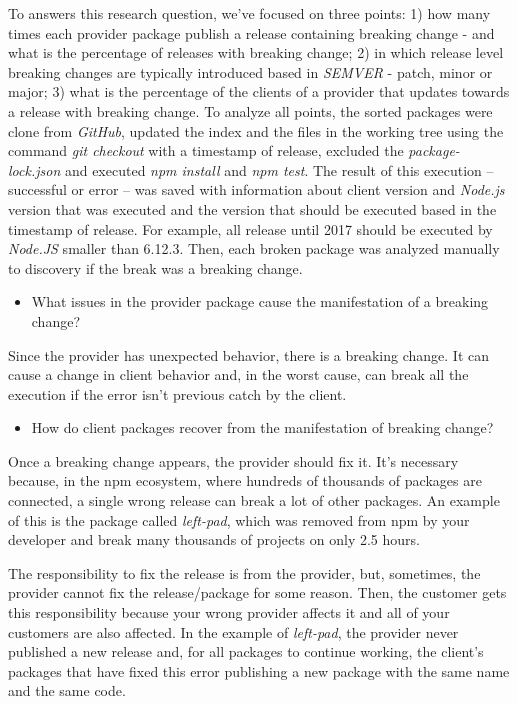 To answers this research question, we’ve focused on three points: 1) how many times each provider package publish a release containing breaking change - and what is the percentage of releases with breaking change; 2) in which release level breaking changes are typically introduced based in \textit{SEMVER} - patch, minor or major; 3) what is the percentage of the clients of a provider that updates towards a release with breaking change. To analyze all points, the sorted packages were clone from \textit{GitHub}, updated the index and the files in the working tree using the command \textit{git checkout} with a timestamp of release, excluded the \textit{package-lock.json} and executed \textit{npm install} and \textit{npm test}. The result of this execution -- successful or error -- was saved with information about client version and \textit{Node.js} version that was executed and the version that should be executed based in the timestamp of release. For example, all release until 2017 should be executed by \textit{Node.JS} smaller than 6.12.3. Then, each broken package was analyzed manually to discovery if the break was a breaking change.

\begin{itemize}
    \item What issues in the provider package cause the manifestation of a breaking change?
\end{itemize}

Since the provider has unexpected behavior, there is a breaking change. It can cause a change in client behavior and, in the worst cause, can break all the execution if the error isn’t previous catch by the client.

\begin{itemize}
    \item How do client packages recover from the manifestation of breaking change?
\end{itemize}

Once a breaking change appears, the provider should fix it. It’s necessary because, in the npm ecosystem, where hundreds of thousands of packages are connected, a single wrong release can break a lot of other packages. An example of this is the package called \textit{left-pad}, which was removed from npm by your developer and break many thousands of projects on only 2.5 hours.

The responsibility to fix the release is from the provider, but, sometimes, the provider cannot fix the release/package for some reason. Then, the customer gets this responsibility because your wrong provider affects it and all of your customers are also affected. In the example of \textit{left-pad}, the provider never published a new release and, for all packages to continue working, the client's packages that have fixed this error publishing a new package with the same name and the same code.

